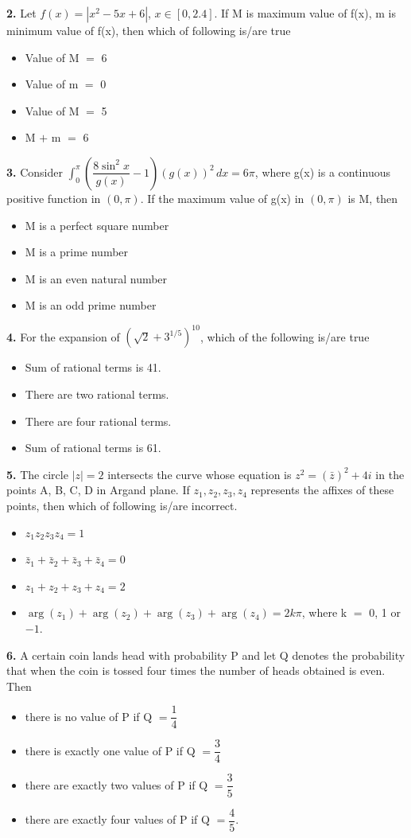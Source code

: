 \documentclass[10pt,twocolumn]{extarticle}
\newenvironment{qoptions}{\begin{itemize}[leftmargin=1.8em,itemsep=2pt,topsep=2pt,label={}]}{\end{itemize}}
\newcommand{\opt}[2]{\item[({#1})] {#2}}
\begin{document}
\textbf{2.} Let $f(x)=|x^2-5x+6|$, $x\in[0,2.4]$. If M is maximum value of f(x), m is minimum value of f(x), then which of following is/are true

\begin{qoptions}
\opt{A}{Value of M $=$ 6}
\opt{B}{Value of m $=$ 0}
\opt{C}{Value of M $=$ 5}
\opt{D}{M $+$ m $=$ 6}
\end{qoptions}

\textbf{3.} Consider $\displaystyle\int_0^\pi\left(\dfrac{8\sin^2x}{g(x)}-1\right)(g(x))^2\,dx=6\pi$, where g(x) is a continuous positive function in $(0,\pi)$. If the maximum value of g(x) in $(0,\pi)$ is M, then

\begin{qoptions}
\opt{A}{M is a perfect square number}
\opt{B}{M is a prime number}
\opt{C}{M is an even natural number}
\opt{D}{M is an odd prime number}
\end{qoptions}

\textbf{4.} For the expansion of $\left(\sqrt2+3^{1/5}\right)^{10}$, which of the following is/are true

\begin{qoptions}
\opt{A}{Sum of rational terms is 41.}
\opt{B}{There are two rational terms.}
\opt{C}{There are four rational terms.}
\opt{D}{Sum of rational terms is 61.}
\end{qoptions}

\textbf{5.} The circle $|z|=2$ intersects the curve whose equation is $z^2=(\bar z)^2+4i$ in the points A, B, C, D in Argand plane. If $z_1,z_2,z_3,z_4$ represents the affixes of these points, then which of following is/are incorrect.

\begin{qoptions}
\opt{A}{$z_1z_2z_3z_4=1$}
\opt{B}{$\bar z_1+\bar z_2+\bar z_3+\bar z_4=0$}
\opt{C}{$z_1+z_2+z_3+z_4=2$}
\opt{D}{$\arg(z_1)+\arg(z_2)+\arg(z_3)+\arg(z_4)=2k\pi$, where k $=$ 0, 1 or $-1$.}
\end{qoptions}

\textbf{6.} A certain coin lands head with probability P and let Q denotes the probability that when the coin is tossed four times the number of heads obtained is even. Then

\begin{qoptions}
\opt{A}{there is no value of P if Q $=\dfrac14$}
\opt{B}{there is exactly one value of P if Q $=\dfrac34$}
\opt{C}{there are exactly two values of P if Q $=\dfrac35$}
\opt{D}{there are exactly four values of P if Q $=\dfrac45$.}
\end{qoptions}
\end{document}
